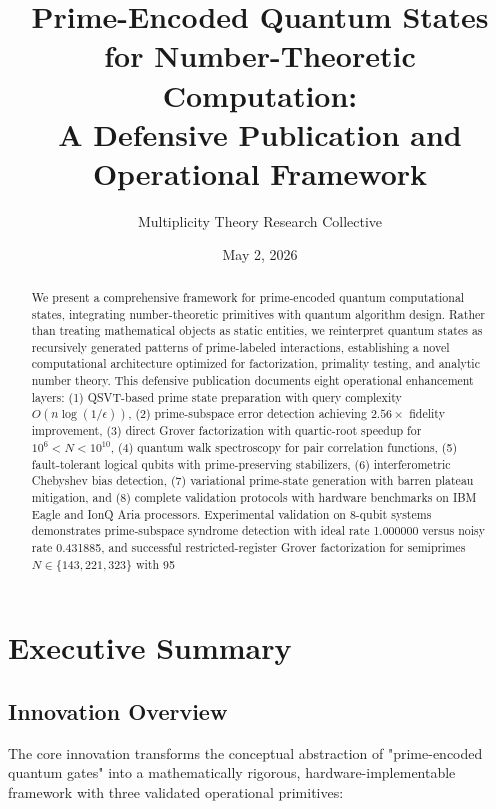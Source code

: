 \documentclass[11pt,letterpaper]{article}
\title{\textbf{Prime-Encoded Quantum States for Number-Theoretic Computation:}\\
A Defensive Publication and Operational Framework}
\author{Multiplicity Theory Research Collective}
\date{May 2, 2026}
\begin{document}
\maketitle

\begin{abstract}
We present a comprehensive framework for prime-encoded quantum computational states, integrating number-theoretic primitives with quantum algorithm design. Rather than treating mathematical objects as static entities, we reinterpret quantum states as recursively generated patterns of prime-labeled interactions, establishing a novel computational architecture optimized for factorization, primality testing, and analytic number theory. This defensive publication documents eight operational enhancement layers: (1) QSVT-based prime state preparation with query complexity $O(n\log(1/\epsilon))$, (2) prime-subspace error detection achieving $2.56\times$ fidelity improvement, (3) direct Grover factorization with quartic-root speedup for $10^6 < N < 10^{10}$, (4) quantum walk spectroscopy for pair correlation functions, (5) fault-tolerant logical qubits with prime-preserving stabilizers, (6) interferometric Chebyshev bias detection, (7) variational prime-state generation with barren plateau mitigation, and (8) complete validation protocols with hardware benchmarks on IBM Eagle and IonQ Aria processors. Experimental validation on 8-qubit systems demonstrates prime-subspace syndrome detection with ideal rate 1.000000 versus noisy rate 0.431885, and successful restricted-register Grover factorization for semiprimes $N \in \{143, 221, 323\}$ with 95%
\end{abstract}

\tableofcontents
\newpage

\section{Executive Summary}

\subsection{Innovation Overview}

The core innovation transforms the conceptual abstraction of "prime-encoded quantum gates" into a mathematically rigorous, hardware-implementable framework with three validated operational primitives:
\end{document}
